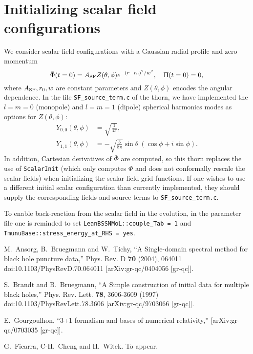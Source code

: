 \section{Initializing scalar field configurations}
We consider scalar field configurations with a Gaussian radial profile and zero momentum
\begin{equation}
    \bar{\Phi}(t=0) = A_{\rm SF} Z(\theta, \phi) e^{-(r-r_0)^2/w^2},
    \quad
    \Pi(t=0) = 0,
\end{equation}
where $A_{\rm SF}, r_0, w$ are constant parameters
and $Z(\theta, \phi)$ encodes the angular dependence.
In the file \texttt{SF\_source\_term.c} of the thorn, we have implemented
the $l=m=0$ (monopole) and $l=m=1$ (dipole) spherical harmonics modes
as options for $Z(\theta, \phi)$:
\begin{align}
    Y_{0,0}(\theta, \phi)
    &= \sqrt{\frac{1}{4\pi}},
    \\
    Y_{1,1}(\theta, \phi)
    &= -\sqrt{\frac{3}{8\pi}} \sin\theta\ (\cos\phi + i \sin\phi).
\end{align}
In addition, Cartesian derivatives of $\bar{\Phi}$ are computed,
so this thorn replaces the use of \texttt{ScalarInit}
(which only computes $\Phi$ and does not conformally rescale the scalar fields)
when initializing the scalar field grid functions.
If one wishes to use a different initial scalar configuration than currently implemented,
they should supply the corresponding fields and source terms to \texttt{SF\_source\_term.c}.

To enable back-reaction from the scalar field in the evolution, in the parameter file one
is reminded to set \texttt{LeanBSSNMoL::couple\_Tab = 1} and
\texttt{TmunuBase::stress\_energy\_at\_RHS = yes}.

\begin{thebibliography}{9}
M.~Ansorg, B.~Bruegmann and W.~Tichy,
``A Single-domain spectral method for black hole puncture data,''
Phys. Rev. D \textbf{70} (2004), 064011
doi:10.1103/PhysRevD.70.064011
[arXiv:gr-qc/0404056 [gr-qc]].

S.~Brandt and B.~Bruegmann,
``A Simple construction of initial data for multiple black holes,''
Phys. Rev. Lett. \textbf{78}, 3606-3609 (1997)
doi:10.1103/PhysRevLett.78.3606
[arXiv:gr-qc/9703066 [gr-qc]].

E.~Gourgoulhon,
``3+1 formalism and bases of numerical relativity,''
[arXiv:gr-qc/0703035 [gr-qc]].

  G.~Ficarra, C-H.~Cheng and H.~Witek. To appear.


\end{thebibliography}



